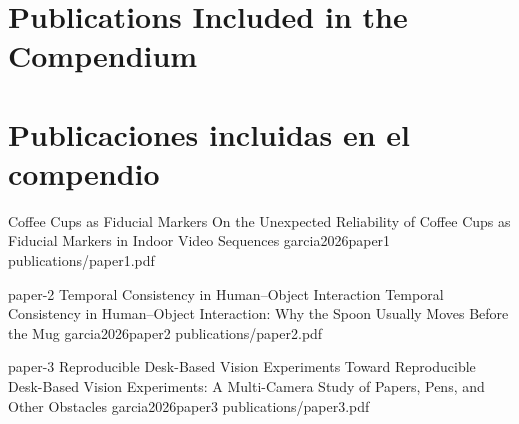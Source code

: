 \documentclass[spanish,openright]{book}
\begin{document}

  {\part{Publications Included in the Compendium}} %
  {\part{Publicaciones incluidas en el compendio}} %
\label{part:compendium-publications}               %

 {Coffee Cups as Fiducial Markers}
 {On the Unexpected Reliability of Coffee Cups as Fiducial Markers in Indoor Video Sequences}
 {garcia2026paper1}
 {publications/paper1.pdf}

 {paper-2}
 {Temporal Consistency in Human--Object Interaction}
 {Temporal Consistency in Human--Object Interaction: Why the Spoon Usually Moves Before the Mug}
 {garcia2026paper2}
 {publications/paper2.pdf}

 {paper-3}
 {Reproducible Desk-Based Vision Experiments}
 {Toward Reproducible Desk-Based Vision Experiments: A Multi-Camera Study of Papers, Pens, and Other Obstacles}
 {garcia2026paper3}
 {publications/paper3.pdf}

%   
%
\end{document}
